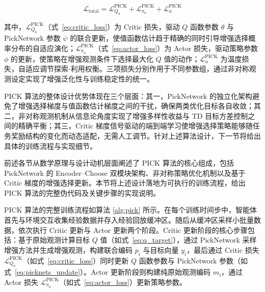 \begin{equation}
    \mathcal{L}_{\text{total}} = \mathcal{L}_{Q_a}^{\text{PICK}} + \mathcal{L}_{\pi_a}^{\text{PICK}} + \mathcal{L}_\alpha^{\text{PICK}}
\end{equation}

其中，$\mathcal{L}_{Q_a}^{\text{PICK}}$（式~\eqref{eq:critic_loss}）为 Critic 损失，驱动 $Q$ 函数参数 $\theta$ 与 PickNetwork 参数 $\psi$ 的联合更新，使值函数估计趋于精确的同时引导增强选择概率分布的自适应演化；$\mathcal{L}_{\pi_a}^{\text{PICK}}$（式~\eqref{eq:actor_loss}）为 Actor 损失，驱动策略参数 $\phi$ 的更新，使策略在增强观测条件下选择最大化 $Q$ 值的动作；$\mathcal{L}_\alpha^{\text{PICK}}$ 为温度损失，自适应调节探索-利用权衡。三项损失分别作用于不同参数组，通过非对称观测设定实现了增强泛化性与训练稳定性的统一。

PICK 算法的整体设计优势体现在三个层面：其一，PickNetwork 的独立化架构避免了增强选择梯度与值函数估计梯度之间的干扰，确保两类优化目标各自收敛；其二，非对称观测机制从信息论角度实现了增强多样性收益与 TD 目标方差控制之间的精确平衡；其三，Critic 梯度信号驱动的端到端学习使增强选择策略能够随任务奖励结构的变化而动态适配，无需人工调节。针对上述算法设计，下一节将给出具体的训练流程与实现细节。


前述各节从数学原理与设计动机层面阐述了 PICK 算法的核心组成，包括 PickNetwork 的 Encoder--Choose 双模块架构、非对称策略优化机制以及基于 Critic 梯度的增强选择更新。本节将上述设计落地为可执行的训练流程，给出 PICK 算法的完整伪代码及关键步骤的实现说明。

PICK 算法的完整训练流程如算法 \ref{alg:pick} 所示。在每个训练时间步中，智能体首先与环境交互收集经验数据并存入经验回放缓冲区。随后从缓冲区采样小批量数据，依次执行 Critic 更新与 Actor 更新两个阶段。Critic 更新阶段的核心步骤包括：基于原始观测计算目标 $Q$ 值（如式~\eqref{eq:q_target}），通过 PickNetwork 采样增强方法并生成增强观测，构建联合编码 $p_i$ 与目标向量 $y_i$，最后通过 Critic 损失 $\mathcal{L}_{Q_a}^{\text{PICK}}$（如式~\eqref{eq:critic_loss}）同时更新 $Q$ 函数参数与 PickNetwork 参数（如式~\eqref{eq:picknets_update}）。Actor 更新阶段则构建纯原始观测编码 $m_i$，通过 Actor 损失 $\mathcal{L}_{\pi_a}^{\text{PICK}}$（如式~\eqref{eq:actor_loss}）更新策略参数。

